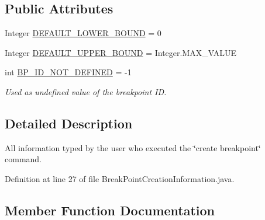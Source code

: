 \subsection*{Public Attributes}
\begin{DoxyCompactItemize}
\item 
Integer \hyperlink{interfacegov_1_1nasa_1_1jpf_1_1inspector_1_1interfaces_1_1_break_point_creation_information_a40131b93f82a84ed5322c4dc5ca4175e}{D\+E\+F\+A\+U\+L\+T\+\_\+\+L\+O\+W\+E\+R\+\_\+\+B\+O\+U\+ND} = 0
\item 
Integer \hyperlink{interfacegov_1_1nasa_1_1jpf_1_1inspector_1_1interfaces_1_1_break_point_creation_information_af917e7de77b2a6fc93c24e1c5a4a5759}{D\+E\+F\+A\+U\+L\+T\+\_\+\+U\+P\+P\+E\+R\+\_\+\+B\+O\+U\+ND} = Integer.\+M\+A\+X\+\_\+\+V\+A\+L\+UE
\item 
int \hyperlink{interfacegov_1_1nasa_1_1jpf_1_1inspector_1_1interfaces_1_1_break_point_creation_information_a24626231e3744e59f505d0731d4ca9e1}{B\+P\+\_\+\+I\+D\+\_\+\+N\+O\+T\+\_\+\+D\+E\+F\+I\+N\+ED} = -\/1
\begin{DoxyCompactList}\small\item\em Used as undefined value of the breakpoint ID. \end{DoxyCompactList}\end{DoxyCompactItemize}


\subsection{Detailed Description}
All information typed by the user who executed the \char`\"{}create breakpoint\char`\"{} command. 

Definition at line 27 of file Break\+Point\+Creation\+Information.\+java.



\subsection{Member Function Documentation}

